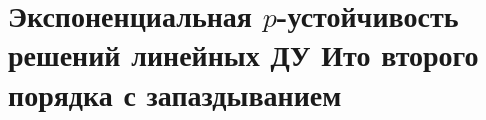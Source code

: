 

\chapter{Экспоненциальная $p$-устойчивость решений линейных ДУ Ито второго порядка с запаздыванием}




%
%
%

